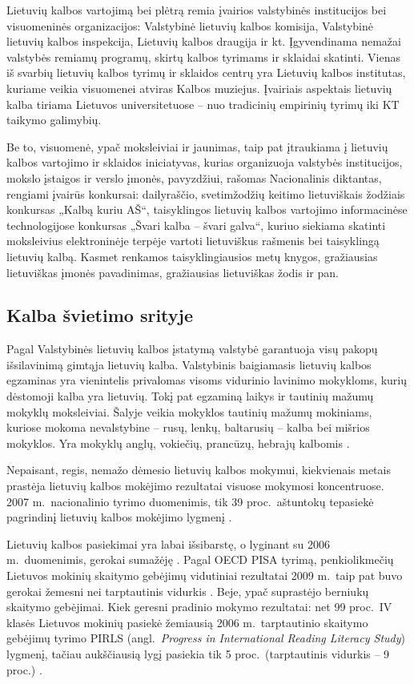 \begin{multicols}{2}
    Lietuvių kalbos vartojimą bei plėtrą remia įvairios valstybinės institucijos bei visuomeninės organizacijos: Valstybinė lietuvių kalbos komisija, Valstybinė lietuvių kalbos inspekcija, Lietuvių kalbos draugija ir kt. Įgyvendinama nemažai valstybės remiamų programų, skirtų kalbos tyrimams ir sklaidai skatinti.
Vienas iš svarbių lietuvių kalbos tyrimų ir sklaidos centrų yra Lietuvių kalbos institutas, kuriame veikia visuomenei atviras Kalbos muziejus. Įvairiais aspektais lietuvių kalba tiriama Lietuvos universitetuose – nuo tradicinių empirinių tyrimų iki KT taikymo galimybių.

Be to, visuomenė, ypač moksleiviai ir jaunimas, taip pat įtraukiama į lietuvių kalbos vartojimo ir sklaidos iniciatyvas, kurias organizuoja valstybės institucijos, mokslo įstaigos ir verslo įmonės, pavyzdžiui, rašomas Nacionalinis diktantas, rengiami įvairūs konkursai: dailyraščio, svetimžodžių keitimo lietuviškais žodžiais konkursas „Kalbą kuriu AŠ“, taisyklingos lietuvių kalbos vartojimo informacinėse technologijose konkursas „Švari kalba – švari galva“, kuriuo siekiama skatinti moksleivius elektroninėje terpėje vartoti lietuviškus rašmenis bei taisyklingą lietuvių kalbą. Kasmet renkamos taisyklingiausios metų knygos, gražiausias lietuviškas įmonės pavadinimas, gražiausias lietuviškas žodis ir pan.

\subsection{Kalba švietimo srityje}

Pagal Valstybinės lietuvių kalbos įstatymą valstybė garantuoja visų pakopų išsilavinimą gimtąja lietuvių kalba. Valstybinis baigiamasis lietuvių kalbos egzaminas yra vienintelis privalomas visoms vidurinio lavinimo mokykloms, kurių dėstomoji kalba yra lietuvių. Tokį pat egzaminą laikys ir tautinių mažumų mokyklų moksleiviai. Šalyje veikia mokyklos tautinių mažumų mokiniams, kuriose mokoma nevalstybine – rusų, lenkų, baltarusių – kalba bei mišrios mokyklos. Yra mokyklų anglų, vokiečių, prancūzų, hebrajų kalbomis \cite{smm1}.  

    Nepaisant, regis, nemažo dėmesio lietuvių kalbos mokymui, kiekvienais metais prastėja lietuvių kalbos mokėjimo rezultatai visuose mokymosi koncentruose. 2007 m.~nacionalinio tyrimo duomenimis, tik 39 proc.~aštuntokų tepasiekė pagrindinį lietuvių kalbos mokėjimo lygmenį \cite{smm1}.   

    Lietuvių kalbos pasiekimai yra labai išsibarstę, o lyginant su 2006 m.~duomenimis, gerokai sumažėję \cite{smm2}.  Pagal OECD PISA tyrimą, penkiolikmečių Lietuvos mokinių skaitymo gebėjimų vidutiniai rezultatai 2009 m.~taip pat buvo gerokai žemesni nei tarptautinis vidurkis \cite{nec1}.  Beje, ypač suprastėjo berniukų skaitymo gebėjimai. Kiek geresni pradinio mokymo rezultatai: net 99 proc.~IV klasės Lietuvos mokinių pasiekė žemiausią 2006 m.~tarptautinio skaitymo gebėjimų tyrimo PIRLS (angl.~\textit{Progress in International Reading Literacy Study}) lygmenį, tačiau aukščiausią lygį pasiekia tik 5 proc.~(tarptautinis vidurkis – 9 proc.) \cite{nec2}.   


\end{multicols}
